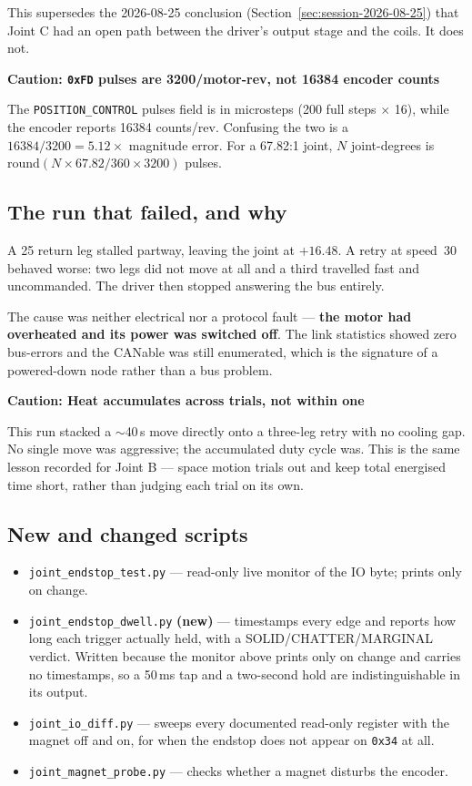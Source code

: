 \documentclass[11pt,letterpaper]{article}
\newenvironment{caution}[1]{%
    \par\addvspace{8pt}%
    \noindent{\color{cautionred}\rule{\linewidth}{0.8pt}}\par\vspace{2pt}
    \noindent\textbf{\color{cautionred}Caution: #1}\par\vspace{2pt}
}{%
    \par\vspace{2pt}\noindent{\color{cautionred}\rule{\linewidth}{0.4pt}}%
    \par\addvspace{8pt}%
}
\begin{document}
This supersedes the 2026-08-25 conclusion (Section~\ref{sec:session-2026-08-25})
that Joint C had an open path between the driver's output stage and the coils.
It does not.

\begin{caution}{\texttt{0xFD} pulses are 3200/motor-rev, not 16384 encoder counts}
The \texttt{POSITION\_CONTROL} pulses field is in microsteps
(200 full steps $\times$ 16), while the encoder reports 16384 counts/rev.
Confusing the two is a $16384/3200 = 5.12\times$ magnitude error. For a
67.82:1 joint, $N$ joint-degrees is
$\text{round}(N \times 67.82 / 360 \times 3200)$ pulses.
\end{caution}

\subsection{The run that failed, and why}
A 25\textdegree{} return leg stalled partway, leaving the joint at
$+16.48$\textdegree{}. A retry at speed~30 behaved worse: two legs did not move
at all and a third travelled fast and uncommanded. The driver then stopped
answering the bus entirely.

The cause was neither electrical nor a protocol fault --- \textbf{the motor had
overheated and its power was switched off}. The link statistics showed zero
bus-errors and the CANable was still enumerated, which is the signature of a
powered-down node rather than a bus problem.

\begin{caution}{Heat accumulates across trials, not within one}
This run stacked a $\sim$40\,s move directly onto a three-leg retry with no
cooling gap. No single move was aggressive; the accumulated duty cycle was.
This is the same lesson recorded for Joint B --- space motion trials out and
keep total energised time short, rather than judging each trial on its own.
\end{caution}

\subsection{New and changed scripts}
\begin{itemize}
    \item \texttt{joint\_endstop\_test.py} --- read-only live monitor of the IO
    byte; prints only on change.
    \item \texttt{joint\_endstop\_dwell.py} \textbf{(new)} --- timestamps every
    edge and reports how long each trigger actually held, with a
    SOLID/CHATTER/MARGINAL verdict. Written because the monitor above prints
    only on change and carries no timestamps, so a 50\,ms tap and a two-second
    hold are indistinguishable in its output.
    \item \texttt{joint\_io\_diff.py} --- sweeps every documented read-only
    register with the magnet off and on, for when the endstop does not appear
    on \texttt{0x34} at all.
    \item \texttt{joint\_magnet\_probe.py} --- checks whether a magnet disturbs
    the encoder.
\end{itemize}
\end{document}

